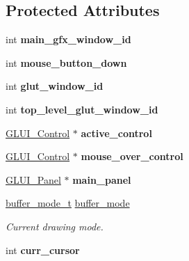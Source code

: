 \subsection*{Protected Attributes}
\begin{DoxyCompactItemize}
\item 
\hypertarget{classGLUI__Main_a43cd4a18026504db98178d766d18a78c}{int {\bfseries main\-\_\-gfx\-\_\-window\-\_\-id}}\label{classGLUI__Main_a43cd4a18026504db98178d766d18a78c}

\item 
\hypertarget{classGLUI__Main_a5002dc3587df870eb12a62be1568861b}{int {\bfseries mouse\-\_\-button\-\_\-down}}\label{classGLUI__Main_a5002dc3587df870eb12a62be1568861b}

\item 
\hypertarget{classGLUI__Main_a4c2cd2330267eca938028a8a6fcb6382}{int {\bfseries glut\-\_\-window\-\_\-id}}\label{classGLUI__Main_a4c2cd2330267eca938028a8a6fcb6382}

\item 
\hypertarget{classGLUI__Main_afec9a40c9b4c139934236d094fcf81f6}{int {\bfseries top\-\_\-level\-\_\-glut\-\_\-window\-\_\-id}}\label{classGLUI__Main_afec9a40c9b4c139934236d094fcf81f6}

\item 
\hypertarget{classGLUI__Main_a552e13b05f63046ebe3f1911e27e3d58}{\hyperlink{classGLUI__Control}{G\-L\-U\-I\-\_\-\-Control} $\ast$ {\bfseries active\-\_\-control}}\label{classGLUI__Main_a552e13b05f63046ebe3f1911e27e3d58}

\item 
\hypertarget{classGLUI__Main_a74c11c17faf8a0c957d5654c420dc97f}{\hyperlink{classGLUI__Control}{G\-L\-U\-I\-\_\-\-Control} $\ast$ {\bfseries mouse\-\_\-over\-\_\-control}}\label{classGLUI__Main_a74c11c17faf8a0c957d5654c420dc97f}

\item 
\hypertarget{classGLUI__Main_a727ecf1f0315ff01503415dc420b47a2}{\hyperlink{classGLUI__Panel}{G\-L\-U\-I\-\_\-\-Panel} $\ast$ {\bfseries main\-\_\-panel}}\label{classGLUI__Main_a727ecf1f0315ff01503415dc420b47a2}

\item 
\hypertarget{classGLUI__Main_a4ba466d21144d6fd0c7984039523ad2f}{\hyperlink{classGLUI__Main_a0024f5e2750f6fe9e428ff885cf6d62e}{buffer\-\_\-mode\-\_\-t} \hyperlink{classGLUI__Main_a4ba466d21144d6fd0c7984039523ad2f}{buffer\-\_\-mode}}\label{classGLUI__Main_a4ba466d21144d6fd0c7984039523ad2f}

\begin{DoxyCompactList}\small\item\em Current drawing mode. \end{DoxyCompactList}\item 
\hypertarget{classGLUI__Main_a661d825dbff47caee733683f557491cf}{int {\bfseries curr\-\_\-cursor}}\label{classGLUI__Main_a661d825dbff47caee733683f557491cf}


\end{DoxyCompactItemize}
